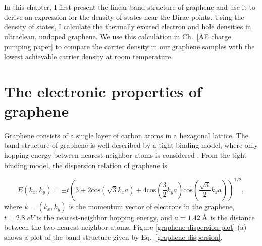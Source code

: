 \documentclass{beavtex_dub_edit}
\begin{document}
In this chapter, I first present the linear band structure of graphene and use it to derive an expression for the density of states near the Dirac points. Using the density of states, I calculate the thermally excited electron and hole densities in ultraclean, undoped graphene. We use this calculation in Ch.\ \ref{AE charge pumping paper} to compare the carrier density in our graphene samples with the lowest achievable carrier density at room temperature.

\section{The electronic properties of graphene} \label{the electronic properties of graphene}

Graphene consists of a single layer of carbon atoms in a hexagonal lattice. The band structure of graphene is well-described by a tight binding model, where only hopping energy between nearest neighbor atoms is considered \cite{wallace_band_1947}. From the tight binding model, the dispersion relation of graphene is 

\begin{equation}
    E(k_x, k_y) = \pm t  \left(3 + 2\mathrm{cos}(\sqrt{3}k_x a) + 4\mathrm{cos}(\frac{3}{2}k_y a)\mathrm{cos}(\frac{\sqrt{3}}{2}k_x a)\right)^{1/2}, \label{graphene dispersion}
\end{equation}
where $k = (k_x, k_y)$ is the momentum vector of electrons in the graphene, $t = 2.8 \; eV$ is the nearest-neighbor hopping energy, and $a = 1.42 \;\SIUnitSymbolAngstrom$ is the distance between the two nearest neighbor atoms. Figure \ref{graphene dispersion plot} (a) shows a plot of the band structure given by Eq.\ \ref{graphene dispersion}.
\end{document}
